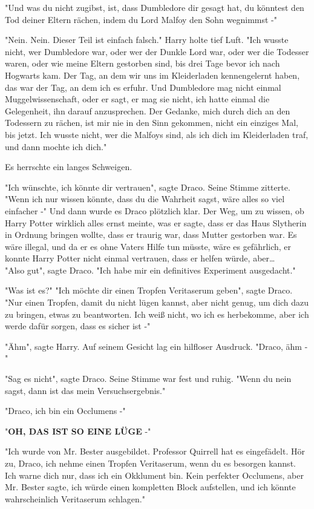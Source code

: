 {"Und was du nicht zugibst, ist, dass Dumbledore dir gesagt hat, du könntest den Tod deiner Eltern rächen, indem du Lord Malfoy den Sohn wegnimmst -"

"Nein. Nein. Dieser Teil ist einfach falsch." Harry holte tief Luft. "Ich wusste nicht, wer Dumbledore war, oder wer der Dunkle Lord war, oder wer die Todesser waren, oder wie meine Eltern gestorben sind, bis drei Tage bevor ich nach Hogwarts kam. Der Tag, an dem wir uns im Kleiderladen kennengelernt haben, das war der Tag, an dem ich es erfuhr. Und Dumbledore mag nicht einmal Muggelwissenschaft, oder er sagt, er mag sie nicht, ich hatte einmal die Gelegenheit, ihn darauf anzusprechen. Der Gedanke, mich durch dich an den Todessern zu rächen, ist mir nie in den Sinn gekommen, nicht ein einziges Mal, bis jetzt. Ich wusste nicht, wer die Malfoys sind, als ich dich im Kleiderladen traf, und dann mochte ich dich."

Es herrschte ein langes Schweigen.

"Ich wünschte, ich könnte dir vertrauen", sagte Draco. Seine Stimme zitterte. "Wenn ich nur wissen könnte, dass du die Wahrheit sagst, wäre alles so viel einfacher -" Und dann wurde es Draco plötzlich klar. Der Weg, um zu wissen, ob Harry Potter wirklich alles ernst meinte, was er sagte, dass er das Haus Slytherin in Ordnung bringen wollte, dass er traurig war, dass Mutter gestorben war. Es wäre illegal, und da er es ohne Vaters Hilfe tun müsste, wäre es gefährlich, er konnte Harry Potter nicht einmal vertrauen, dass er helfen würde, aber…\\ "Also gut", sagte Draco. "Ich habe mir ein definitives Experiment ausgedacht."

"Was ist es?" "Ich möchte dir einen Tropfen Veritaserum geben", sagte Draco. "Nur einen Tropfen, damit du nicht lügen kannst, aber nicht genug, um dich dazu zu bringen, etwas zu beantworten. Ich weiß nicht, wo ich es herbekomme, aber ich werde dafür sorgen, dass es sicher ist -"

"Ähm", sagte Harry. Auf seinem Gesicht lag ein hilfloser Ausdruck. "Draco, ähm -"

"Sag es nicht", sagte Draco. Seine Stimme war fest und ruhig. "Wenn du nein sagst, dann ist das mein Versuchsergebnis."

"Draco, ich bin ein Occlumens -"

"\textbf{OH, DAS IST SO EINE LÜGE} -"

"Ich wurde von Mr. Bester ausgebildet. Professor Quirrell hat es eingefädelt. Hör zu, Draco, ich nehme einen Tropfen Veritaserum, wenn du es besorgen kannst. Ich warne dich nur, dass ich ein Okklument bin. Kein perfekter Occlumens, aber Mr. Bester sagte, ich würde einen kompletten Block aufstellen, und ich könnte wahrscheinlich Veritaserum schlagen."

}
